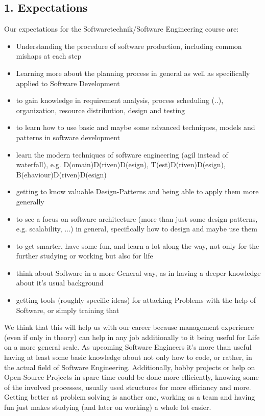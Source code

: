 \documentclass{scrartcl}
\begin{document}
\subsection*{1. Expectations}
Our expectations for the Softwaretechnik/Software Engineering course are:
\begin{itemize}
\item Understanding the procedure of software production, including common mishaps at each step
\item Learning more about the planning process in general as well as specifically applied to Software Development
\item to gain knowledge in requirement analysis, process scheduling (..), organization, resource distribution, design and testing
\item to learn how to use basic and maybe some advanced techniques, models and patterns in software development
\item learn the modern techniques of software engineering (agil instead of waterfall), e.g. D(omain)D(riven)D(esign), T(est)D(riven)D(esign), B(ehaviour)D(riven)D(esign)
\item getting to know valuable Design-Patterns and being able to apply them more generally
\item to see a focus on software architecture (more than just some design patterns, e.g. scalability, ...) in general, specifically how to design and maybe use them
\item to get smarter, have some fun, and learn a lot along the way, not only for the further studying or working but also for life
\item think about Software in a more General way, as in having a deeper knowledge about it's usual background
\item getting tools (roughly specific ideas) for attacking Problems with the help of Software, or simply training that
\end{itemize}

We think that this will help us with our career because management experience (even if only in theory) can help in any job additionally to it being useful for Life on a more general scale.
As upcoming Software Engineers it's more than useful having at least some basic knowledge about not only how to code, or rather, in the actual field of Software Engineering.
Additionally, hobby projects or help on Open-Source Projects in spare time could be done more efficiently, knowing some of the involved processes, usually used structures for more efficiancy and more.
Getting better at problem solving is another one, working as a team and having fun just makes studying (and later on working) a whole lot easier.
\end{document}
